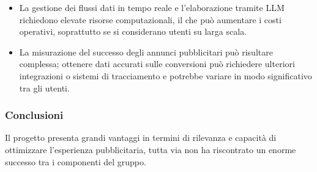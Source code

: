     \begin{itemize}
        \item La gestione dei flussi dati in tempo reale e l’elaborazione tramite LLM richiedono elevate risorse computazionali, il che può aumentare i costi operativi, soprattutto se si considerano utenti su larga scala.
        \item La misurazione del successo degli annunci pubblicitari può risultare complessa; ottenere dati accurati sulle conversioni può richiedere ulteriori integrazioni o sistemi di tracciamento e potrebbe variare in modo significativo tra gli utenti.
    \end{itemize}
    
    \subsubsection{Conclusioni}

    Il progetto presenta grandi vantaggi in termini di rilevanza e capacità di ottimizzare l'esperienza pubblicitaria, tutta via non ha riscontrato un enorme successo tra i componenti del gruppo.
